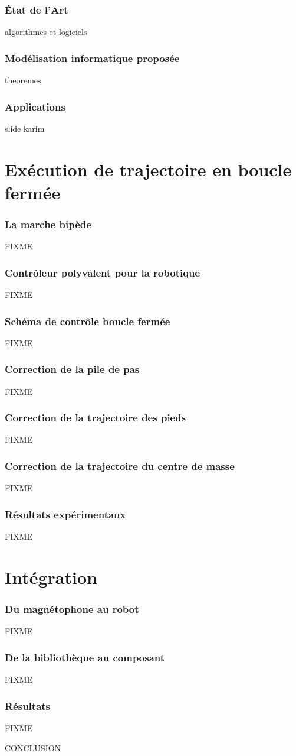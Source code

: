 \documentclass[14pt,utf8x,hyperref={pdfpagelabels=false}]{beamer}
\begin{document}
\begin{frame}
  \frametitle{État de l'Art}

  algorithmes et logiciels
\end{frame}

\begin{frame}
  \frametitle{Modélisation informatique proposée}

  theoremes
\end{frame}

\begin{frame}
  \frametitle{Applications}

  slide karim
\end{frame}


\section{Exécution de trajectoire en boucle fermée}

\begin{frame}
  \frametitle{La marche bipède}

  FIXME
\end{frame}

\begin{frame}
  \frametitle{Contrôleur polyvalent pour la robotique}

  FIXME
\end{frame}

\begin{frame}
  \frametitle{Schéma de contrôle boucle fermée}

  FIXME
\end{frame}

\begin{frame}
  \frametitle{Correction de la pile de pas}

  FIXME
\end{frame}

\begin{frame}
  \frametitle{Correction de la trajectoire des pieds}

  FIXME
\end{frame}

\begin{frame}
  \frametitle{Correction de la trajectoire du centre de masse}

  FIXME
\end{frame}


\begin{frame}
  \frametitle{Résultats expérimentaux}

  FIXME
\end{frame}


\section{Intégration}

\begin{frame}
  \frametitle{Du magnétophone au robot}

  FIXME
\end{frame}

\begin{frame}
  \frametitle{De la bibliothèque au composant}

  FIXME
\end{frame}

\begin{frame}
  \frametitle{Résultats}
  FIXME
\end{frame}


\begin{frame}
  CONCLUSION
\end{frame}
\end{document}
